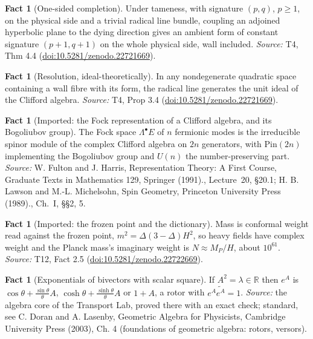 \documentclass[11pt]{article}
\theoremstyle{definition}
\newtheorem{fact}[theorem]{Fact}
\theoremstyle{plain}
\providecommand{\R}{}\renewcommand{\R}{\mathbb{R}}
\begin{document}
\begin{fact}[One-sided completion]\label{c:sheaf.one-sided-completion}
Under tameness, with signature $(p,q)$, $p \geq 1$, on the physical side and a trivial radical line bundle, coupling an adjoined hyperbolic plane to the dying direction gives an ambient form of constant signature $(p{+}1, q{+}1)$ on the whole physical side, wall included.
\emph{Source:} T4, Thm 4.4 (\href{https://doi.org/10.5281/zenodo.22721669}{doi:10.5281/zenodo.22721669}).
\end{fact}

\begin{fact}[Resolution, ideal-theoretically]\label{c:sheaf.resolution-ideal-theoretically}
In any nondegenerate quadratic space containing a wall fibre with its form, the radical line generates the unit ideal of the Clifford algebra.
\emph{Source:} T4, Prop 3.4 (\href{https://doi.org/10.5281/zenodo.22721669}{doi:10.5281/zenodo.22721669}).
\end{fact}

\begin{fact}[Imported: the Fock representation of a Clifford algebra, and its Bogoliubov group]\label{c:standard-model.imported-fock-representation-clifford-algebra-bogoliubov}
The Fock space $\Lambda^{\bullet}E$ of $n$ fermionic modes is the irreducible spinor module of the complex Clifford algebra on $2n$ generators, with $\mathrm{Pin}(2n)$ implementing the Bogoliubov group and $U(n)$ the number-preserving part.
\emph{Source:} W. Fulton and J. Harris, Representation Theory: A First Course, Graduate Texts in Mathematics 129, Springer (1991)., Lecture~20, \S 20.1; H. B. Lawson and M.-L. Michelsohn, Spin Geometry, Princeton University Press (1989)., Ch.~I, \S\S 2, 5.
\end{fact}

\begin{fact}[Imported: the frozen point and the dictionary]\label{c:standard-model.imported-frozen-point-dictionary}
Mass is conformal weight read against the frozen point, $m^{2} = \Delta(3-\Delta)H^{2}$, so heavy fields have complex weight and the Planck mass's imaginary weight is $N \approx M_{P}/H$, about $10^{61}$.
\emph{Source:} T12, Fact 2.5 (\href{https://doi.org/10.5281/zenodo.22722669}{doi:10.5281/zenodo.22722669}).
\end{fact}

\begin{fact}[Exponentials of bivectors with scalar square]\label{c:std-algebra.bivector-exponential}
If $A^{2} = \lambda \in \R$ then $e^{A}$ is $\cos\theta + \frac{\sin\theta}{\theta}A$, $\cosh\theta + \frac{\sinh\theta}{\theta}A$ or $1 + A$, a rotor with $e^{A}\widetilde{e^{A}} = 1$.
\emph{Source:} the algebra core of the Transport Lab, proved there with an exact check; standard, see C. Doran and A. Lasenby, Geometric Algebra for Physicists, Cambridge University Press (2003), Ch. 4 (foundations of geometric algebra: rotors, versors).
\end{fact}
\end{document}
